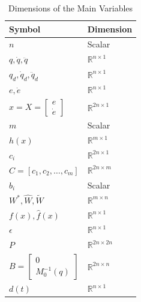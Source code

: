 \begin{table}[!t]
	\caption{Dimensions of the Main Variables}
	\label{tab:notation}
	\centering
	\renewcommand{\arraystretch}{1.15}
	\begin{tabular}{ll}
		\hline
		\textbf{Symbol} & \textbf{Dimension}\\
		\hline
		$n$
		& Scalar
		\\
		$q,\dot q,\ddot q$
		& $\mathbb{R}^{n\times1}$
		\\
		$q_d,\dot q_d,\ddot q_d$
		& $\mathbb{R}^{n\times1}$
		\\
		$e,\dot e$
		& $\mathbb{R}^{n\times1}$
		\\
		$x=X=
		\begin{bmatrix}
			e\\
			\dot e
		\end{bmatrix}$
		& $\mathbb{R}^{2n\times1}$
		\\
		$m$
		& Scalar
		\\
		$h(x)$
		& $\mathbb{R}^{m\times1}$
		\\
		$c_i$
		& $\mathbb{R}^{2n\times1}$
		\\
		$C=[c_1,c_2,\dots,c_m]$
		& $\mathbb{R}^{2n\times m}$
		\\
		$b_i$
		& Scalar
		\\
		$W^*,\hat W,\tilde W$
		& $\mathbb{R}^{m\times n}$
		\\
		$f(x),\hat f(x)$
		& $\mathbb{R}^{n\times1}$
		\\
		$\epsilon$
		& $\mathbb{R}^{n\times1}$
		\\
		$P$
		& $\mathbb{R}^{2n\times2n}$
		\\
		$B=
		\begin{bmatrix}
			0\\
			M_0^{-1}(q)
		\end{bmatrix}$
		& $\mathbb{R}^{2n\times n}$
		\\
		$d(t)$
		& $\mathbb{R}^{n\times1}$
		\\
		\hline
	\end{tabular}
\end{table}